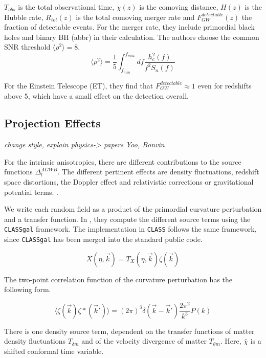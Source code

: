 $T_{obs}$ is the total observational time, $\chi(z)$ is the comoving distance, $H(z)$ is the Hubble rate, $R_{tot}(z)$ is the total comoving merger rate and $F_{GW}^{detectable}(z)$ the fraction of detectable events. For the merger rate, they include primordial black holes and binary BH (abbr) in their calculation.
The authors choose the common SNR threshold $\langle \rho^2 \rangle =8$.
\begin{equation}
    \langle \rho^2 \rangle = \frac{1}{5}\int_{f_{min}}^{f_{max}} df \frac{h_c^2(f)}{f^2 S_n(f)}
\end{equation}

For the Einstein Telescope (ET), they find that $F_{GW}^{detectable} \approx 1$ even for redshifts above 5, which have a small effect on the detection overall.

\subsection{Projection Effects}

\textit{change style,}
\textit{explain physics-> papers Yoo, Bonvin}

For the intrinsic anisotropies, there are different contributions to the source functions $\Delta_l^{AGWB}$. The different pertinent effects are density fluctuations, redshift space distortions, the Doppler effect and relativistic corrections or gravitational potential terms. \cite{di_dio_classgal_2013}.

We write each random field as a product of the primordial curvature perturbation and a transfer function. In \cite{dallarmi_dipole_2022}, they compute the different source terms using the {\tt CLASSgal} framework. The implementation in {\tt CLASS} follows the same framework, since {\tt CLASSgal} has been merged into the standard public code.

\begin{equation}
    X(\eta, \vec{k}) = T_X(\eta, \vec{k})\zeta(\vec{k})
\end{equation}

The two-point correlation function of the curvature perturbation has the following form.

\begin{equation}
    \langle \zeta(\vec{k})\zeta*(\vec{k}')\rangle = (2\pi)^3 \delta(\vec{k}-\vec{k}')\frac{2\pi^2}{k^3}P(k)
\end{equation}

There is one density source term, dependent on the transfer functions of matter density fluctuations $T_{\delta m}$ and of the velocity divergence of matter $T_{\theta m}$. Here, $\bar{\chi}$ is a shifted conformal time variable.

